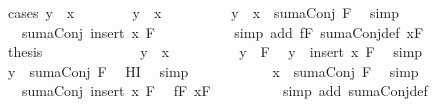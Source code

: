 \begin{isabellebody}
\ {\isacharparenleft}cases\ {\isachardoublequoteopen}y\ {\isacharequal}\ x{\isachardoublequoteclose}{\isacharparenright}\isanewline
\ \ \ \ \ \ \isamarkupfalse%
\ {\isachardoublequoteopen}y\ {\isacharequal}\ x{\isachardoublequoteclose}\isanewline
\ \ \ \ \ \ \isamarkupfalse%
\ \isamarkupfalse%
\ {\isachardoublequoteopen}y\ {\isasymle}\ x\ {\isacharplus}\ {\isacharparenleft}sumaConj\ F{\isacharparenright}{\isachardoublequoteclose}\ \isamarkupfalse%
\ simp\isanewline
\ \ \ \ \ \ \isamarkupfalse%
\ \isamarkupfalse%
\ {\isachardoublequoteopen}{\isasymdots}\ {\isacharequal}\ sumaConj\ {\isacharparenleft}insert\ x\ F{\isacharparenright}{\isachardoublequoteclose}\ \isanewline
\ \ \ \ \ \ \ \ \isamarkupfalse%
\ {\isacharparenleft}simp\ add{\isacharcolon}\ fF\ sumaConj{\isacharunderscore}def\ xF{\isacharparenright}\ \isanewline
\ \ \ \ \ \ \isamarkupfalse%
\ \isamarkupfalse%
\ {\isacharquery}thesis\ \isacommand{{\isachardot}}\isamarkupfalse%
\isanewline
\ \ \ \ \isamarkupfalse%
\isanewline
\ \ \ \ \ \ \isamarkupfalse%
\ {\isachardoublequoteopen}y\ {\isasymnoteq}\ x{\isachardoublequoteclose}\isanewline
\ \ \ \ \ \ \isamarkupfalse%
\ \isamarkupfalse%
\ {\isachardoublequoteopen}y\ {\isasymin}\ F{\isachardoublequoteclose}\ \isamarkupfalse%
\ {\isacharbackquoteopen}y\ {\isasymin}\ insert\ x\ F{\isacharbackquoteclose}\ \isamarkupfalse%
\ simp\isanewline
\ \ \ \ \ \ \isamarkupfalse%
\ \isamarkupfalse%
\ {\isachardoublequoteopen}y\ {\isasymle}\ sumaConj\ F{\isachardoublequoteclose}\ \isamarkupfalse%
\ HI\ \isamarkupfalse%
\ simp\isanewline
\ \ \ \ \ \ \isamarkupfalse%
\ \isamarkupfalse%
\ {\isachardoublequoteopen}{\isasymdots}\ {\isasymle}\ x\ {\isacharplus}\ {\isacharparenleft}sumaConj\ F{\isacharparenright}{\isachardoublequoteclose}\ \isamarkupfalse%
\ simp\isanewline
\ \ \ \ \ \ \isamarkupfalse%
\ \isamarkupfalse%
\ {\isachardoublequoteopen}{\isasymdots}\ {\isacharequal}\ sumaConj\ {\isacharparenleft}insert\ x\ F{\isacharparenright}{\isachardoublequoteclose}\ \isamarkupfalse%
\ fF\ xF\isanewline
\ \ \ \ \ \ \ \ \isamarkupfalse%
\ {\isacharparenleft}simp\ add{\isacharcolon}\ sumaConj{\isacharunderscore}def{\isacharparenright}\isanewline

\end{isabellebody}
